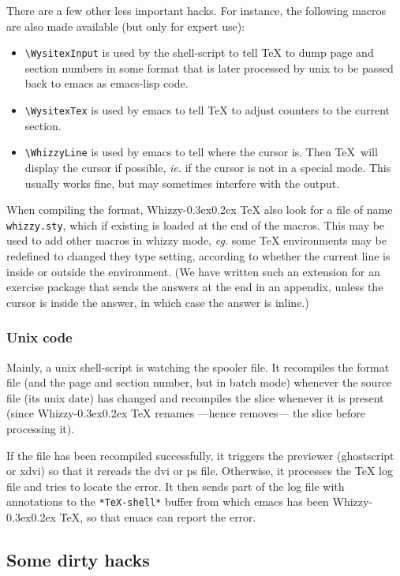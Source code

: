 \documentclass{article}
\let \lst \verb
\def \whizzy{{Whizzy\kern -0.3ex\raise 0.2ex \hbox{\TeX}}}
\begin{document}
There are a few other less important hacks. For instance, the following
macros are also made available (but only for expert use):
\begin {itemize}
\item
\lst"\WysitexInput" is used by the shell-script to tell {\TeX} to dump page
and section  numbers in some format that is later processed by unix to be
passed back to emacs as emacs-lisp code.
\item
\lst"\WysitexTex" is used by emacs to tell {\TeX} to adjust counters to
the current section. 
\item
\lst"\WhizzyLine" is used by emacs to tell where the cursor is.
Then \TeX\ will display the cursor if possible, {\em ie.} if the cursor is
not in a special mode. This usually works fine, but may sometimes interfere
with the output. 
\end {itemize}
When compiling the format, {\whizzy} also look for a file of name
\lst"whizzy.sty", which if existing is loaded at the end of the macros. 
This may be used to add other macros in {whizzy} mode, {\em eg.} 
some {\TeX} environments may be redefined to changed they type setting,
according to whether the current line is inside or outside the environment. 
(We have written such an extension for an exercise package that sends the
answers at the end in an appendix, unless the cursor is inside the answer,
in which case the answer is inline.)

\subsubsection* {Unix code}

Mainly, a unix shell-script is watching the spooler file.  It recompiles the
format file (and the page and section number, but in batch mode) whenever
the source file (its unix date) has changed  and 
recompiles the slice whenever it is present (since {\whizzy} renames ---hence
removes--- the slice before processing it).

If the file has been recompiled successfully, it triggers the previewer
(ghostscript or xdvi) so that it rereads the dvi or ps file. Otherwise, it
processes the {\TeX} log file and tries to locate the error. It then sends part
of the log file with annotations to the \lst"*TeX-shell*" buffer from which
emacs has been {\whizzy}, so that emacs can report the error. 


\subsection{Some dirty hacks}
\end{document}
